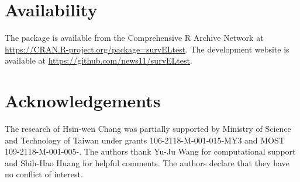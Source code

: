 \bigskip

\section{Availability} \label{sec:avail}

The package is available from the Comprehensive R
Archive Network at \url{https://CRAN.R-project.org/package=survELtest}.
The development website is available at \url{https://github.com/news11/survELtest}.



\section{Acknowledgements}  The research of Hsin-wen Chang was partially supported by Ministry of Science and Technology of Taiwan under grants 106-2118-M-001-015-MY3 and MOST 109-2118-M-001-005-. The authors thank Yu-Ju Wang for computational support and Shih-Hao Huang for helpful comments. The authors declare that they have no conflict of interest.

 

\address{Hsin-wen Chang\\
Institute of Statistical Science\\
Academia Sinica\\
128 Academia Road, Section 2,\\
Nankang, Taipei 11529, Taiwan (R.O.C)\\
ORCiD: 0000-0003-4566-7047\\
}

\address{Pei-Yuan Tsai\\
Institute of Statistical Science\\
Academia Sinica\\
Taipei, Taiwan (R.O.C)
}

\address{Jen-Tse Kao\\
Institute of Statistical Science\\
Academia Sinica\\
Taipei, Taiwan (R.O.C)
}

\address{Guo-You Lan\\
Department of Economics\\
National Chengchi University\\
Taipei, Taiwan (R.O.C)
}

\newpage
	
\appendix


